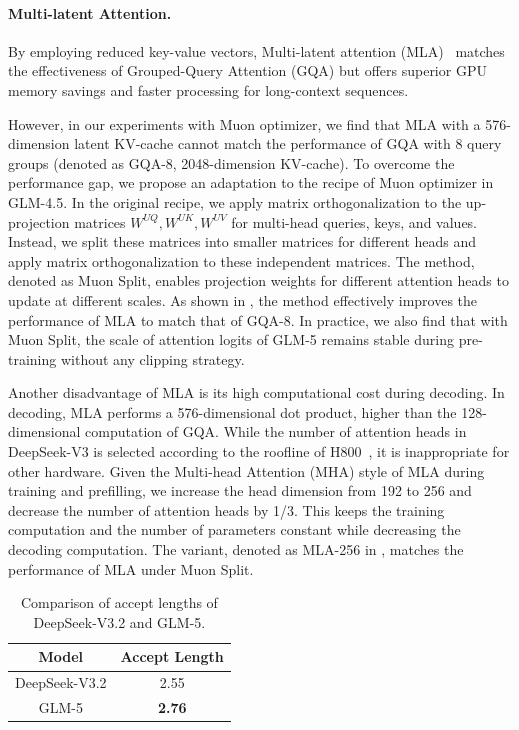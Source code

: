 \documentclass{article}
\theoremstyle{definition}
\begin{document}
\paragraph{Multi-latent Attention.} By employing reduced key-value vectors, Multi-latent attention (MLA)~\cite{liu2024deepseekv2} matches the effectiveness of Grouped-Query Attention (GQA) but offers superior GPU memory savings and faster processing for long-context sequences.

However, in our experiments with Muon optimizer, we find that MLA with a 576-dimension latent KV-cache cannot match the performance of GQA with 8 query groups (denoted as GQA-8, 2048-dimension KV-cache). To overcome the performance gap, we propose an adaptation to the recipe of Muon optimizer in GLM-4.5.
In the original recipe, we apply matrix orthogonalization to the up-projection matrices $W^{UQ}, W^{UK}, W^{UV}$ for multi-head queries, keys, and values. Instead, we split these matrices into smaller matrices for different heads and apply matrix orthogonalization to these independent matrices. The method, denoted as Muon Split, enables projection weights for different attention heads to update at different scales. As shown in , the method effectively improves the performance of MLA to match that of GQA-8. In practice, we also find that with Muon Split, the scale of attention logits of GLM-5 remains stable during pre-training without any clipping strategy.

Another disadvantage of MLA is its high computational cost during decoding. In decoding, MLA performs a 576-dimensional dot product, higher than the 128-dimensional computation of GQA. While the number of attention heads in DeepSeek-V3 is selected according to the roofline of H800~\cite{zhao2025insights}, it is inappropriate for other hardware. Given the Multi-head Attention (MHA) style of MLA during training and prefilling, we increase the head dimension from 192 to 256 and decrease the number of attention heads by 1/3. This keeps the training computation
and the number of parameters constant while decreasing the decoding computation. The variant, denoted as MLA-256 in , matches the performance of MLA under Muon Split.

\begin{table}
    \centering
    \caption{Comparison of accept lengths of DeepSeek-V3.2 and GLM-5.}
    \label{tab:mtp}
    \begin{tabular}{c|c}
        \toprule
        Model  & Accept Length \\
        \midrule
        DeepSeek-V3.2 & 2.55 \\
        GLM-5  & \textbf{2.76}\\
        \bottomrule
    \end{tabular}
\end{table}
\end{document}
